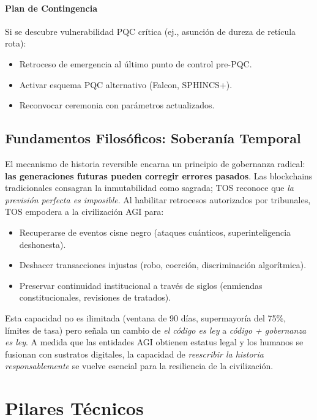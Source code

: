 \documentclass[11pt]{article}
\begin{document}
\paragraph{Plan de Contingencia}
Si se descubre vulnerabilidad PQC crítica (ej., asunción de dureza de retícula rota):
\begin{itemize}[noitemsep]
  \item Retroceso de emergencia al último punto de control pre-PQC.
  \item Activar esquema PQC alternativo (Falcon, SPHINCS+).
  \item Reconvocar ceremonia con parámetros actualizados.
\end{itemize}

\subsection{Fundamentos Filosóficos: Soberanía Temporal}

El mecanismo de historia reversible encarna un principio de gobernanza radical: \textbf{las generaciones futuras pueden corregir errores pasados}. Las blockchains tradicionales consagran la inmutabilidad como sagrada; TOS reconoce que \emph{la previsión perfecta es imposible}. Al habilitar retrocesos autorizados por tribunales, TOS empodera a la civilización AGI para:
\begin{itemize}[noitemsep]
  \item Recuperarse de eventos cisne negro (ataques cuánticos, superinteligencia deshonesta).
  \item Deshacer transacciones injustas (robo, coerción, discriminación algorítmica).
  \item Preservar continuidad institucional a través de siglos (enmiendas constitucionales, revisiones de tratados).
\end{itemize}

Esta capacidad no es ilimitada (ventana de 90 días, supermayoría del 75\%, límites de tasa) pero señala un cambio de \emph{el código es ley} a \emph{código + gobernanza es ley}. A medida que las entidades AGI obtienen estatus legal y los humanos se fusionan con sustratos digitales, la capacidad de \emph{reescribir la historia responsablemente} se vuelve esencial para la resiliencia de la civilización.

\section{Pilares Técnicos}
\end{document}
